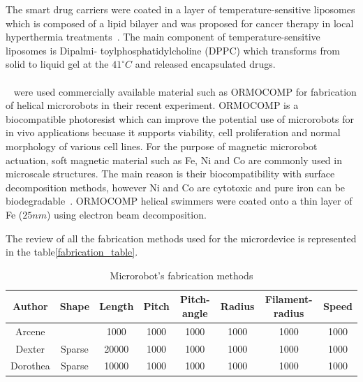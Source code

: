 \documentclass[12pt,a4paper,titlepage]{report}
\newcommand{\head}[1]{\textnormal{\textbf{#1}}}
\begin{document}
The smart drug carriers were coated in a layer of temperature-sensitive liposomes which is composed 
of a lipid bilayer and was proposed for cancer therapy in local hyperthermia treatments~\citep{qiu2014artificial}.
The main component of temperature-sensitive liposomes is Dipalmi- toylphosphatidylcholine (DPPC) which
transforms from solid to liquid gel at the $41^{\circ} C$ and released encapsulated drugs.

\paragraph{}
 \citeauthor{qiu2014noncytotoxic}~\citep{qiu2014noncytotoxic} were used commercially available material such as ORMOCOMP
 for fabrication of helical microrobots in their recent experiment. ORMOCOMP is a biocompatible photoresist which
can improve the potential use of microrobots for in vivo applications becuase it supports viability, cell proliferation
 and normal morphology of various cell lines. For the purpose of magnetic microrobot actuation, soft magnetic material
such as Fe, Ni and Co are commonly used in microscale structures. The main reason is their biocompatibility
with surface decomposition methods, however Ni and Co are cytotoxic and pure iron can be biodegradable~\citep{qiu2014noncytotoxic}.
ORMOCOMP helical swimmers were coated onto a thin layer of Fe ($25 nm$) using electron beam decomposition.
  


The review of all the fabrication methods used for the micrordevice is represented in the table\ref{fabrication_table}.

\begin{table}[!ht]

\centering%
{
\begin{tabular}{c c c c c c c c}%
\toprule[2.0pt]



\head{Author} & \head{Shape} & \head{Length} & \head{Pitch} & \head{Pitch-angle} & \head{Radius} & \head{Filament-radius} & \head{Speed}\\

\midrule
Arcene 	& 	    		  & 	1000		& 	1000		& 	1000		& 	1000		& 	1000		& 	1000\\%
Dexter 	& 	Sparse 		  & 	20000	& 	1000		& 	1000		& 	1000		& 	1000		& 	1000\\
Dorothea & 	Sparse 		  & 	10000	& 	1000		& 	1000		& 	1000		& 	1000		& 	1000\\[1ex]%



\bottomrule[2.0pt]
\end{tabular}
}
\label{fabrication_table}%
\caption{Microrobot\rq{}s fabrication methods}\label{fabrication table}%
\end{table}
\end{document}

